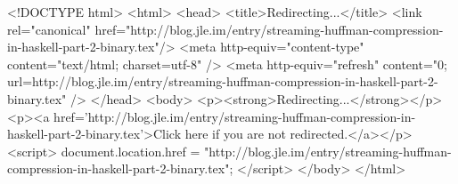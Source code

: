 <!DOCTYPE html>
<html>
<head>
<title>Redirecting...</title>
<link rel="canonical" href="http://blog.jle.im/entry/streaming-huffman-compression-in-haskell-part-2-binary.tex"/>
<meta http-equiv="content-type" content="text/html; charset=utf-8" />
<meta http-equiv="refresh" content="0; url=http://blog.jle.im/entry/streaming-huffman-compression-in-haskell-part-2-binary.tex" />
</head>
<body>
  <p><strong>Redirecting...</strong></p>
  <p><a href='http://blog.jle.im/entry/streaming-huffman-compression-in-haskell-part-2-binary.tex'>Click here if you are not redirected.</a></p>
  <script>
    document.location.href = "http://blog.jle.im/entry/streaming-huffman-compression-in-haskell-part-2-binary.tex";
  </script>
</body>
</html>
